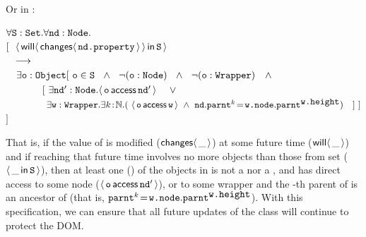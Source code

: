 \noindent Or in \Chainmail:

%
%
\vspace{.1cm}

\noindent
$\forall {\mbox{\tt{S}}}:{\mbox{\tt{Set}}}.\forall {\mbox{\tt{nd}}}:{\mbox{\tt{Node}}}.$\\
$[\ \ {\langle\, {\mathsf{will}}\langle \,{\mathsf{changes}}\langle\,{\mbox{\tt{nd.property}}}\,\rangle\,\rangle\, \mathsf{in}\, {\mbox{\tt{S}}}\, \rangle}$ \\
$\strut  \ \ \longrightarrow$\\
$\strut \ \ \ \exists {\mbox{\tt{o}}}:{\mbox{\tt{Object}}}[\ {\mbox{\tt{o}}}\in{\mbox{\tt{S}}}\ \ \wedge\ \ \neg({\mbox{\tt{o}}}:{\mbox{\tt{Node}}})\ \ \wedge\  \ \neg({\mbox{\tt{o}}}:{\mbox{\tt{Wrapper}}})\ \ \ \wedge \  $\\
$ \strut\ \ \  \ \ \ \ \ \ \ \ [\ \exists {\mbox{\tt{nd}}}':{\mbox{\tt{Node}}}. \langle\, {\mbox{\tt{o}}}\, \mathsf{access}\, {\mbox{\tt{nd}}}'\, \rangle\  \ \ \  \vee$\\
$ \strut\ \  \ \  \ \  \ \ \ \ \ \ \ \exists {\mbox{\tt{w}}}:{\mbox{\tt{Wrapper}}}.\exists k\!:\!\mathbb{N}.
  (\ \langle\, {\mbox{\tt{o}}}\, \mathsf{access}\, {\mbox{\tt{w}}}\, \rangle  \ \wedge\ {\mbox{\tt{nd}}}.{\mbox{\tt{parnt}}}^k\!=\!{\mbox{\tt{w.node}}}.{\mbox{\tt{parnt}}}^{{\mbox{\tt{w.height}}}}) \ \ \ ]\ ]$\\
$ ]$

\vspace{.1cm}
\noindent
That is, if the value of  is modified
(${\mathsf{changes}}\langle\,\_\,\rangle$) at some future time (${\mathsf{will}}\langle \,\_\,\rangle$) and if reaching
that future time involves no more objects than those from set 
(\ie ${\langle\, \_\, \mathsf{in}\, {\mbox{\tt{S}}}\, \rangle}$), then at least one () of the
objects in  is not a  nor a ,
and  has direct access to some node
($\langle\, {\mbox{\tt{o}}}\, \mathsf{access}\, {\mbox{\tt{nd}}}'\, \rangle$), or to some wrapper  and
the -th parent of  is an ancestor of 
(that is,
${\mbox{\tt{parnt}}}^k\!=\!{\mbox{\tt{w.node}}}.{\mbox{\tt{parnt}}}^{{\mbox{\tt{w.height}}}}$).
%
%
With this specification, we can ensure
that all future updates of
the  class will continue to
protect the DOM.


 
